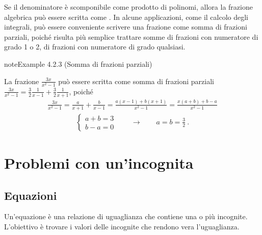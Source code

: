 \documentclass[letterpaper,10pt,italian]{jupyterBook}
\begin{document}
\sphinxAtStartPar
Se il denominatore è scomponibile come prodotto di polinomi, allora la frazione algebrica può essere scritta come . In alcune applicazioni, come il calcolo degli integrali, può essere conveniente scrivere una frazione come somma di frazioni parziali, poiché risulta più semplice trattare somme di frazioni con numeratore di grado 1 o 2, di frazioni con numeratore di grado qualsiasi.
\label{ch/algebra/real-algebra:example-2}
\begin{sphinxadmonition}{note}{Example 4.2.3 (Somma di frazioni parziali)}



\sphinxAtStartPar
La frazione \(\frac{3x}{x^2-1}\) può essere scritta come somma di frazioni parziali \(\frac{3 x}{x^2-1} = \frac{3}{2} \frac{1}{x-1} + \frac{3}{2}\frac{1}{x+1}\), poiché
\begin{equation*}
\begin{split}\frac{3x}{x^2-1} = \frac{a}{x+1} + \frac{b}{x-1} = \frac{a(x-1) + b(x+1)}{x^2-1} = \frac{x(a+b)+b-a}{x^2-1}\end{split}
\end{equation*}\begin{equation*}
\begin{split}\begin{cases} a + b = 3 \\ b - a = 0 \end{cases} \qquad \rightarrow \qquad a = b = \frac{3}{2} \ .\end{split}
\end{equation*}\end{sphinxadmonition}


\section{Problemi con un’incognita}
\label{\detokenize{ch/algebra/real-algebra:problemi-con-un-incognita}}

\subsection{Equazioni}
\label{\detokenize{ch/algebra/real-algebra:equazioni}}\label{\detokenize{ch/algebra/real-algebra:math-hs-algebra-real-eq}}
\sphinxAtStartPar
Un’equazione è una relazione di uguaglianza che contiene una o più incognite. L’obiettivo è trovare i valori delle incognite che rendono vera l’uguaglianza.
\end{document}
